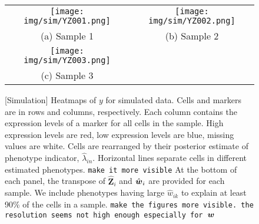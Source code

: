 \documentclass[12pt,]{article}
\def\beginmyfig{\begin{figure}[H]\center}
\def\endmyfig{\end{figure}}
\def\Z{\bm{Z}}
\newcommand{\true}{{\mbox{\tiny TR}}}
\newcommand{\bZ}{\mbox{\boldmath $Z$}}
\newcommand{\bw}{\mbox{\boldmath $w$}}
\def\beginmyfig{\begin{figure}[H]\center}
\def\endmyfig{\end{figure}}
\begin{document}
\begin{figure}[th!]
  \begin{center}
\begin{tabular}{cc}
\texttt{[image: img/sim/YZ001.png]}&
\texttt{[image: img/sim/YZ002.png]}\\
(a) Sample 1 & (b) Sample 2\\
\texttt{[image: img/sim/YZ003.png]}&\\
(c) Sample 3 & \\
  \end{tabular}
 \end{center}
 \vspace{-0.05in}
\caption{[Simulation]  Heatmaps of $y$ for simulated data. Cells and markers are in rows and columns, respectively. Each column contains the expression levels of a
marker for all cells in the sample. High expression levels are red, low expression levels are blue, missing values are white.   Cells are rearranged by their posterior estimate of phenotype indicator, $\hat{\lambda}_{in}$.   Horizontal lines separate cells in different estimated phenotypes.
{\tt make it more visible}
%
At the bottom of each panel, the transpose of $\hat{\Z}_i$ and $\hat{\bw}_i$ are provided for each sample. We include phenotypes having large $\hat{w}_{ik}$ to explain at least 90\% of the cells in a sample.
{\tt make the figures more visible.  the resolution seems not high enough
especially for $\bw$}
%
}
\label{fig:sim-post-Z}
\end{figure}





\end{document}
